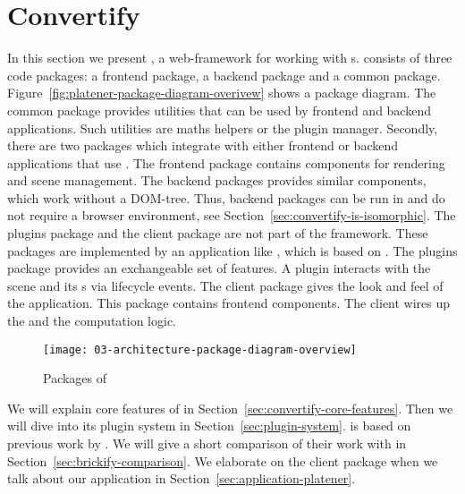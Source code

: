 \documentclass[../../ClassicThesis.tex]{subfiles}
\begin{document}

\section{Convertify}
\label{sec:framework-convertify}

In this section we present {\convertify}, a web-framework for working
with {\threedmodel}s. {\convertify} consists of three code packages: a
frontend package, a backend package and a common package.
Figure~\ref{fig:platener-package-diagram-overivew} shows a package
diagram. The common package provides utilities that can be used by
frontend and backend applications. Such utilities are maths helpers or
the plugin manager. Secondly, there are two packages which integrate
with either frontend or backend applications that use {\convertify}.
The frontend package contains components for rendering and scene
management. The backend packages provides similar components, which
work without a DOM-tree. Thus, backend packages can be run in
{\nodejs} and do not require a browser environment, see
Section~\ref{sec:convertify-is-isomorphic}. The plugins package and
the client package are not part of the {\convertify} framework. These
packages are implemented by an application like {\platener}, which is
based on {\convertify}. The plugins package provides an exchangeable
set of features. A plugin interacts with the scene and its
{\threedmodel}s via lifecycle events. The client package gives the
look and feel of the application. This package contains frontend
components. The client wires up the {\userinterface} and the
computation logic.

\begin{figure}[h]
  \centering
  \texttt{[image: 03-architecture-package-diagram-overview]}
  \caption{Packages of {\convertify}}
  \label{fig:platener-package-diagram-overview}
\end{figure}

We will explain core features of {\convertify} in
Section~\ref{sec:convertify-core-features}. Then we will dive into
its plugin system in Section~\ref{sec:plugin-system}. {\convertify} is
based on previous work by \citeauthor{bachelor-thesis}. We will give a
short comparison of their work with {\convertify} in
Section~\ref{sec:brickify-comparison}. We elaborate on the client
package when we talk about our application {\platener} in
Section~\ref{sec:application-platener}.
\end{document}

